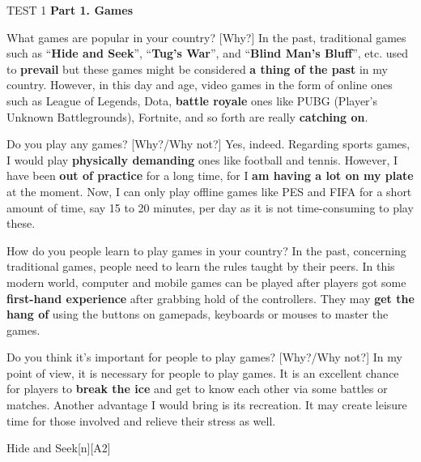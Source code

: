 \begin{glossarymc}[Cambridge 9]
    \begin{test}{TEST 1}
    \noindent
    \textbf{Part 1. Games}
    \begin{qa}{What games are popular in your country? [Why?]}
    In the past, traditional games such as “\textbf{Hide and Seek}”, “\textbf{Tug's War}”, and “\textbf{Blind Man's Bluff}”, etc. used to \textbf{prevail} but these games might be considered \textbf{a thing of the past} in my country. However, in this day and age, video games in the form of online ones such as League of Legends, Dota, \textbf{battle royale} ones like PUBG (Player's Unknown Battlegrounds), Fortnite, and so forth are really \textbf{catching on}.
    \end{qa}

    \begin{qa}{Do you play any games? [Why?/Why not?]}
    Yes, indeed. Regarding sports games, I would play \textbf{physically demanding} ones like football and tennis. However, I have been \textbf{out of practice} for a long time, for I \textbf{am having a lot on my plate} at the moment. Now, I can only play offline games like PES and FIFA for a short amount of time, say 15 to 20 minutes, per day as it is not time-consuming to play these.
    \end{qa}

    \begin{qa}{How do you people learn to play games in your country?}
    In the past, concerning traditional games, people need to learn the rules taught by their peers. In this modern world, computer and mobile games can be played after players got some \textbf{first-hand experience} after grabbing hold of the controllers. They may \textbf{get the hang of} using the buttons on gamepads, keyboards or mouses to master the games.
    \end{qa}

    \begin{qa}{Do you think it's important for people to play games? [Why?/Why not?]}
    In my point of view, it is necessary for people to play games. It is an excellent chance for players to \textbf{break the ice} and get to know each other via some battles or matches. Another advantage I would bring is its recreation. It may create leisure time for those involved and relieve their stress as well.
    \end{qa}

        \begin{VocabExplain}[Part 1]
            \begin{ExplainCard}{Hide and Seek}[n][A2]
            \end{ExplainCard}


\end{VocabExplain}
\end{test}
\end{glossarymc}
